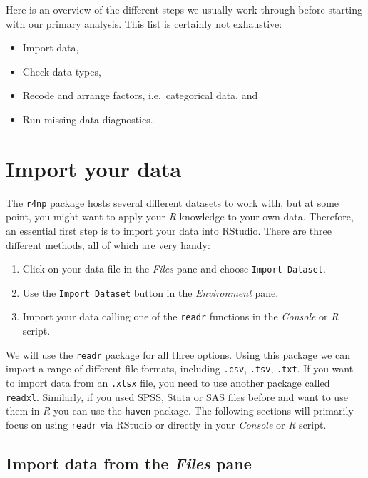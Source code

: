 \documentclass[
  letterpaper,
  DIV=11,
  numbers=noendperiod]{scrreprt}
\begin{document}
Here is an overview of the different steps we usually work through
before starting with our primary analysis. This list is certainly not
exhaustive:

\begin{itemize}
\item
  Import data,
\item
  Check data types,
\item
  Recode and arrange factors, i.e.~categorical data, and
\item
  Run missing data diagnostics.
\end{itemize}

\section{Import your data}\label{sec-import-your-data}

The \texttt{r4np} package hosts several different datasets to work with,
but at some point, you might want to apply your \emph{R} knowledge to
your own data. Therefore, an essential first step is to import your data
into RStudio. There are three different methods, all of which are very
handy:

\begin{enumerate}
\def\labelenumi{\arabic{enumi}.}
\item
  Click on your data file in the \emph{Files} pane and choose
  \texttt{Import\ Dataset}.
\item
  Use the \texttt{Import\ Dataset} button in the \emph{Environment}
  pane.
\item
  Import your data calling one of the \texttt{readr} functions in the
  \emph{Console} or \emph{R} script.
\end{enumerate}

We will use the \texttt{readr} package for all three options. Using this
package we can import a range of different file formats, including
\texttt{.csv}, \texttt{.tsv}, \texttt{.txt}. If you want to import data
from an \texttt{.xlsx} file, you need to use another package called
\texttt{readxl}. Similarly, if you used SPSS, Stata or SAS files before
and want to use them in \emph{R} you can use the \texttt{haven} package.
The following sections will primarily focus on using \texttt{readr} via
RStudio or directly in your \emph{Console} or \emph{R} script.

\subsection{\texorpdfstring{Import data from the \emph{Files}
pane}{Import data from the Files pane}}\label{import-data-from-the-files-pane}
\end{document}
